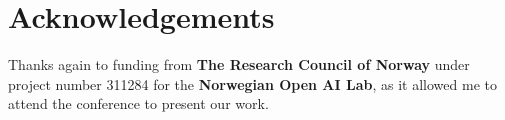 \documentclass[11pt, letterpaper, oneside]{article}
\begin{document}
\section*{Acknowledgements}

Thanks again to funding from \textbf{The Research Council of Norway} under project number 311284 for the \textbf{Norwegian Open AI Lab}, as it allowed me to attend the conference to present our work.


% 
% 

\end{document}
